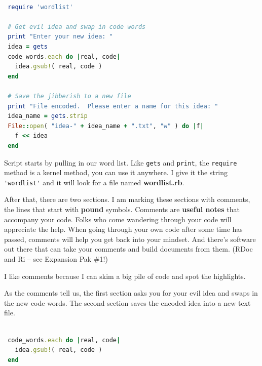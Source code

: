 \documentclass[10pt,twoside]{report}
\begin{document}
\begin{lstlisting}[basicstyle=\ttfamily\color{basiccolor},
    commentstyle = \ttfamily\color{commentcolor},
    keywordstyle=\ttfamily\color{keywordscolor},
    stringstyle=\color{stringcolor},
    language=Ruby,
    basicstyle=\small\ttfamily,
    showstringspaces=false,
  ]

 require 'wordlist'

 # Get evil idea and swap in code words
 print "Enter your new idea: "
 idea = gets
 code_words.each do |real, code|
   idea.gsub!( real, code )
 end

 # Save the jibberish to a new file
 print "File encoded.  Please enter a name for this idea: "
 idea_name = gets.strip
 File::open( "idea-" + idea_name + ".txt", "w" ) do |f|
   f << idea
 end

\end{lstlisting}

Script starts by pulling in our word list.  Like
\lstinline[breaklines=true]|gets| and
\lstinline[breaklines=true]|print|, the
\lstinline[breaklines=true]|require| method is a kernel method, you
can use it anywhere.  I give it the string
\lstinline[breaklines=true]|'wordlist'| and it will look for a file
named {\bf wordlist.rb}.

After that, there are two sections.  I am marking these sections with
comments, the lines that start with {\bf pound} symbols.  Comments are
{\bf useful notes} that accompany your code.  Folks who come wandering
through your code will appreciate the help.  When going through your
own code after some time has passed, comments will help you get back
into your mindset.  And there's software out there that can take your
comments and build documents from them.  (RDoc and Ri -- see Expansion
Pak \#1!)

I like comments because I can skim a big pile of code and spot the
highlights.

As the comments tell us, the first section asks you for your evil idea
and swaps in the new code words.  The second section saves the encoded
idea into a new text file.


\begin{lstlisting}[basicstyle=\ttfamily\color{basiccolor},
    commentstyle = \ttfamily\color{commentcolor},
    keywordstyle=\ttfamily\color{keywordscolor},
    stringstyle=\color{stringcolor},
    language=Ruby,
    basicstyle=\small\ttfamily,
    showstringspaces=false,
  ]

 code_words.each do |real, code|
   idea.gsub!( real, code )
 end

\end{lstlisting}
\end{document}
